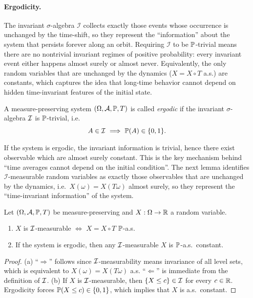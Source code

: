 \paragraph{Ergodicity.}
The invariant $\sigma$-algebra $\mathcal I$ collects exactly those events whose occurrence is unchanged by the time-shift,
so they represent the ``information'' about the system that persists forever along an orbit.
Requiring $\mathcal I$ to be $\mathbb{P}$-trivial means there are no nontrivial invariant regimes of positive probability:
every invariant event either happens almost surely or almost never.
Equivalently, the only random variables that are unchanged by the dynamics ($X=X\circ T$ a.s.) are constants, which captures
the idea that long-time behavior cannot depend on hidden time-invariant features of the initial state.


\begin{definition}[Ergodicity]
A measure-preserving system \((\Omega,\mathcal{A},\mathbb{P},T)\) is called \emph{ergodic} if the invariant \(\sigma\)-algebra \(\mathcal{I}\)
is \(\mathbb{P}\)-trivial, i.e.
\[
A\in\I \ \Longrightarrow\ \Pp(A)\in\{0,1\}.
\]
\end{definition}

If the system is ergodic, the invariant information is trivial, hence there exist observable which are almost surely constant. This is the key mechanism behind ``time averages cannot depend on the initial condition''. The next lemma identifies $\mathcal I$-measurable random variables as exactly those observables that are unchanged by the dynamics, i.e.\ $X(\omega)=X(T\omega)$ almost surely, so they represent the ``time-invariant information'' of the system. 


\begin{lemma}\label{lem:invariant_rv}
Let \((\Omega,\mathcal{A},\mathbb{P},T)\) be measure-preserving and \(X:\Omega\to\mathbb{R}\) a random variable.
\begin{enumerate}[label=(\alph*)]
\item \(X\) is \(\mathcal{I}\)-measurable \(\iff\) \(X = X\circ T\) \(\mathbb{P}\)-a.s.
\item If the system is ergodic, then any \(\mathcal{I}\)-measurable \(X\) is \(\mathbb{P}\)-a.s.\ constant.
\end{enumerate}
\end{lemma}

\begin{proof}
(a) ``\(\Rightarrow\)'' follows since \(\mathcal{I}\)-measurability means invariance of all level sets, which is equivalent to
\(X(\omega)=X(T\omega)\) a.s.  ``\(\Leftarrow\)'' is immediate from the definition of \(\mathcal{I}\).
(b) If \(X\) is \(\mathcal{I}\)-measurable, then \(\{X\le c\}\in\mathcal{I}\) for every \(c\in\mathbb{R}\). Ergodicity forces
\(\mathbb{P}(X\le c)\in\{0,1\}\), which implies that \(X\) is a.s.\ constant.
\end{proof}


